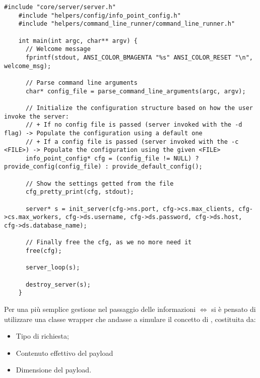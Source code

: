   \begin{lstlisting}[language={[POSIX]C}, style=wnumbers]
    #include "core/server/server.h"
    #include "helpers/config/info_point_config.h"
    #include "helpers/command_line_runner/command_line_runner.h"

    int main(int argc, char** argv) {
      // Welcome message
      fprintf(stdout, ANSI_COLOR_BMAGENTA "%s" ANSI_COLOR_RESET "\n", welcome_msg);

      // Parse command line arguments
      char* config_file = parse_command_line_arguments(argc, argv);

      // Initialize the configuration structure based on how the user invoke the server:
      // + If no config file is passed (server invoked with the -d flag) -> Populate the configuration using a default one
      // + If a config file is passed (server invoked with the -c <FILE>) -> Populate the configuration using the given <FILE>
      info_point_config* cfg = (config_file != NULL) ? provide_config(config_file) : provide_default_config();

      // Show the settings getted from the file
      cfg_pretty_print(cfg, stdout);

      server* s = init_server(cfg->ns.port, cfg->cs.max_clients, cfg->cs.max_workers, cfg->ds.username, cfg->ds.password, cfg->ds.host, cfg->ds.database_name);

      // Finally free the cfg, as we no more need it
      free(cfg);

      server_loop(s);

      destroy_server(s);
    }
  \end{lstlisting}

  \begin{center}  \end{center}
  Per una più semplice gestione nel passaggio delle informazioni  $\Longleftrightarrow$  si è pensato di utilizzare una classe wrapper che andasse a simulare il concetto di \href{https://it.wikipedia.org/wiki/Carico_utile_(informatica)}{}, costituita da:
  \begin{itemize}
    \item Tipo di richiesta;
    \item Contenuto effettivo del payload \footnotemark {}
    \item Dimensione del payload.
  \end{itemize}

